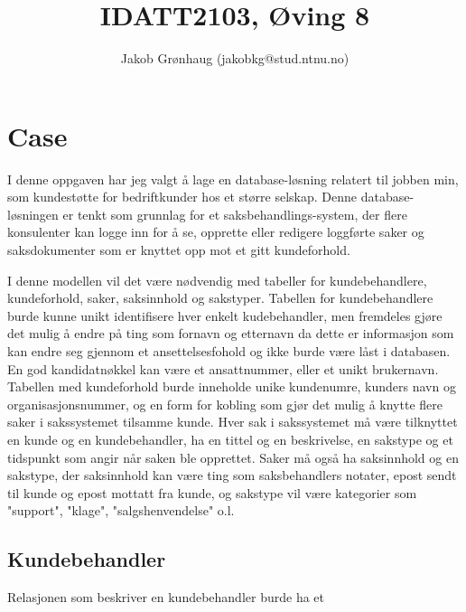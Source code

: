 \documentclass[]{article}
\title{IDATT2103, Øving 8}
\author{Jakob Grønhaug (jakobkg@stud.ntnu.no)}
\date{}
\begin{document}
    \maketitle
    \section*{Case}
    I denne oppgaven har jeg valgt å lage en database-løsning relatert til jobben min, som kundestøtte for bedriftkunder hos et større selskap. Denne database-løsningen er tenkt som grunnlag for et saksbehandlings-system, der flere konsulenter kan logge inn for å se, opprette eller redigere loggførte saker og saksdokumenter som er knyttet opp mot et gitt kundeforhold.

    I denne modellen vil det være nødvendig med tabeller for kundebehandlere, kundeforhold, saker, saksinnhold og sakstyper. Tabellen for kundebehandlere burde kunne unikt identifisere hver enkelt kudebehandler, men fremdeles gjøre det mulig å endre på ting som fornavn og etternavn da dette er informasjon som kan endre seg gjennom et ansettelsesfohold og ikke burde være låst i databasen. En god kandidatnøkkel kan være et ansattnummer, eller et unikt brukernavn. Tabellen med kundeforhold burde inneholde unike kundenumre, kunders navn og organisasjonsnummer, og en form for kobling som gjør det mulig å knytte flere saker i sakssystemet tilsamme kunde. Hver sak i sakssystemet må være tilknyttet en kunde og en kundebehandler, ha en tittel og en beskrivelse, en sakstype og et tidspunkt som angir når saken ble opprettet. Saker må også ha saksinnhold og en sakstype, der saksinnhold kan være ting som saksbehandlers notater, epost sendt til kunde og epost mottatt fra kunde, og sakstype vil være kategorier som "support", "klage", "salgshenvendelse" o.l.

    \subsection*{Kundebehandler}
    Relasjonen som beskriver en kundebehandler burde ha et 
\end{document}

